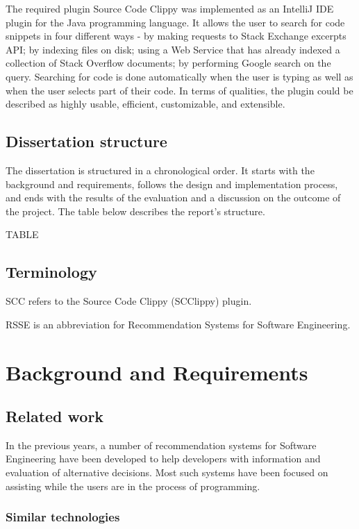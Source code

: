 \documentclass{l4proj}
\begin{document}
The required plugin Source Code Clippy was implemented as an IntelliJ IDE plugin for the Java programming language. It allows the user to search for code snippets in four different ways - by making requests to Stack Exchange excerpts API; by indexing files on disk; using a Web Service that has already indexed a collection of Stack Overflow documents; by performing Google search on the query. Searching for code is done automatically when the user is typing as well as when the user selects part of their code.
In terms of qualities, the plugin could be described as highly usable, efficient, customizable, and extensible.

\section{Dissertation structure}
The dissertation is structured in a chronological order. It starts with the background and requirements, follows the design and implementation process, and ends with the results of the evaluation and a discussion on the outcome of the project. The table below describes the report's structure.

TABLE

\section{Terminology}
SCC refers to the Source Code Clippy (SCClippy) plugin.

RSSE is an abbreviation for Recommendation Systems for Software Engineering.

\chapter{Background and Requirements}

\section{Related work}

In the previous years, a number of recommendation systems for Software Engineering have been developed to help developers with information and evaluation of alternative decisions. Most such systems have been focused on assisting while the users are in the process of programming.

\subsection{Similar technologies}
\end{document}
